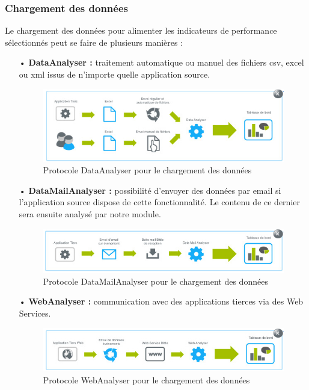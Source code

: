 \subsubsection{Chargement des données}
Le chargement des données pour alimenter les indicateurs de performance sélectionnés peut se faire de plusieurs manières :
\begin{itemize}

\item[•]\textbf{DataAnalyser : } traitement automatique ou manuel des fichiers csv, excel ou xml issus de n’importe quelle application source.

\begin{figure}[H]
\begin{center}
  \includegraphics[scale= 0.6]{dataAnalyser.png}
  \caption{Protocole DataAnalyser pour le chargement des données}
\end{center}  
\end{figure}

\item[•]\textbf{DataMailAnalyser : } possibilité d’envoyer des données par email si l’application source dispose de cette fonctionnalité. Le contenu de ce dernier sera ensuite analysé par notre module.

\begin{figure}[H]
\begin{center}
  \includegraphics[scale= 0.6]{dataMailAnalyser.png}
  \caption{Protocole DataMailAnalyser pour le chargement des données}
\end{center}  
\end{figure}

\item[•]\textbf{WebAnalyser :}  communication avec des applications tierces via des Web Services.

\begin{figure}[H]
\begin{center}
  \includegraphics[scale= 0.6]{webAnalyser.png}
  \caption{Protocole WebAnalyser pour le chargement des données}
\end{center}  
\end{figure}

\end{itemize}

